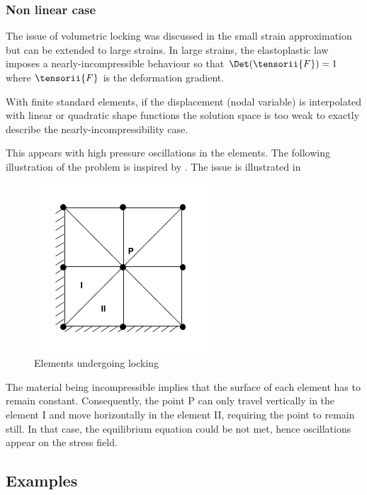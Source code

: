 \subsubsection{Non linear case}

The issue of volumetric locking was discussed in the small strain
approximation but can be extended to large strains. In large strains,
the elastoplastic law imposes a nearly-incompressible behaviour so that
$\Det(\tensorii{F})=1$ where $\tensorii{F}$ is the deformation gradient.

With finite standard elements, if the displacement (nodal variable) is
interpolated with linear or quadratic shape functions the solution space
is too weak to exactly describe the nearly-incompressibility case.

This appears with high pressure oscillations in the elements. The following 
illustration of the problem is inspired by \cite{2016_ZHANG_These}. The 
issue is illustrated in 

\begin{figure}[h!]
    \centering
    \includegraphics[width=7.cm]{img/illustrationlocking.png}
    \caption{Elements undergoing locking}
    \label{fig_locking}
\end{figure}

The material being incompressible implies that the surface of each
element has to remain constant. Consequently, the point P can only
travel vertically in the element I and move horizontally in the element
II, requiring the point to remain still. In that case, the equilibrium
equation could be not met, hence oscillations appear on the stress
field.

\subsection{Examples}


